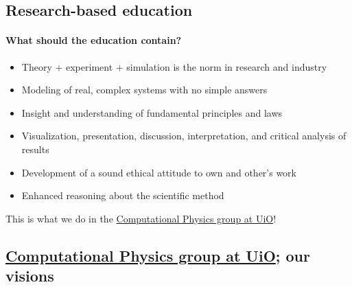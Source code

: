 \documentclass[%
<<<<<<< HEAD
<<<<<<< HEAD
oneside,                 %
final,                   %
=======
twoside,                 %
final,                   %
>>>>>>> 5fc06d357468ca5ec59d2d3ed0179709275f8f00
=======
oneside,                 %
final,                   %
>>>>>>> master
10pt]{article}
\begin{document}



\subsection*{Research-based education}


\paragraph{What should the education contain?}

\begin{itemize}
\item Theory + experiment + simulation is the norm in research and industry

\item Modeling of real, complex systems with no simple answers

\item Insight and understanding of fundamental principles and laws

\item Visualization, presentation, discussion, interpretation, and critical analysis of results

\item Development of a sound ethical attitude to own and other's work

\item Enhanced reasoning about the scientific method
\end{itemize}

\noindent
This is what we do in the \href{{http://www.mn.uio.no/fysikk/english/research/groups/computational/index.html}}{Computational Physics group at UiO}!




\subsection*{\href{{http://www.mn.uio.no/fysikk/english/research/groups/computational/index.html}}{Computational Physics group at UiO}; our visions}


\end{document}
